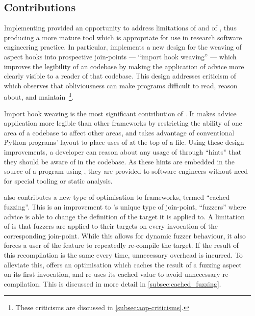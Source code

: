 \subsection{Contributions}

Implementing \pdsfthree provided an opportunity to address limitations of \aop{}
and of \pydysofu{}, thus producing a more mature tool which is appropriate for
use in research software engineering practice. In particular, \pdsfthree{}
implements a new design for the weaving of aspect hooks into prospective
join-points --- ``import hook weaving'' --- which improves the legibility of an
\aspectoriented codebase by making the application of advice more clearly
visible to a reader of that codebase. This design addresses criticism of
\aspectorientation which observes that obliviousness can make programs difficult
to read, reason about, and
maintain~\cite{Constantinides04aopconsidered,steimann06paradoxical,przybylek2010wrong,przybylek2018empirical}\footnote{These
criticisms are discussed in \cref{subsec:aop-criticisms}.}.

Import hook weaving is the most significant contribution of \pdsfthree{}. It
makes advice application more legible than other \aop{} frameworks by
restricting the ability of one area of a codebase to affect other areas, and
takes advantage of conventional Python programs' layout to place uses of \aop{}
at the top of a file. Using these design improvements, a developer can reason
about any usage of \aop{} through ``hints'' that they should be aware of \aop{}
in the codebase. As these hints are embedded in the source of a program using
\pdsfthree{}, they are provided to software engineers without need for special
tooling or static analysis.

\pdsfthree also contributes a new type of optimisation to \aop{} frameworks,
termed ``cached fuzzing''. This is an improvement to \pydysofu{}'s unique type
of join-point, ``fuzzers'' where advice is able to change the definition of the
target it is applied to. A limitation of \pydysofu is that fuzzers are applied
to their targets on every invocation of the corresponding join-point. While this allows
for dynamic fuzzer behaviour, it also forces a user of the feature to repeatedly
re-compile the target. If the result of this recompilation is the same every
time, unnecessary overhead is incurred. To alleviate this,
\pdsfthree{} offers an optimisation which caches the result of a fuzzing aspect
on its first invocation, and re-uses its cached value to avoid unnecessary
re-compilation. This is discussed in more detail in \cref{subsec:cached_fuzzing}. 

